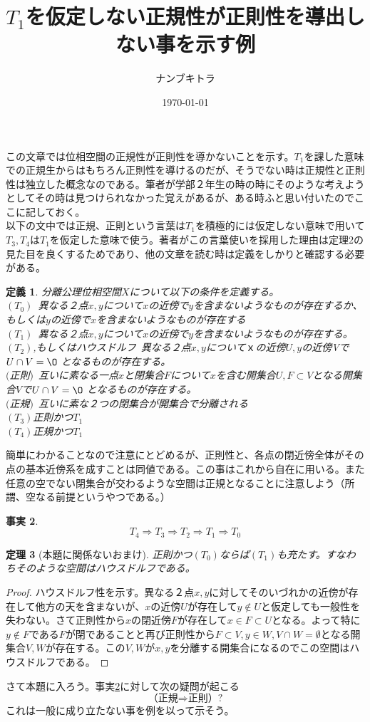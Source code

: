 \documentclass{jsarticle}
\title{$T_1$を仮定しない正規性が正則性を導出しない事を示す例}
\author{ナンブキトラ}
\date{\today}
\newtheorem{thm}{定理}
\newtheorem{df}[thm]{定義}
\newtheorem{fact}[thm]{事実}
\begin{document}
\maketitle
この文章では位相空間の正規性が正則性を導かないことを示す。$T_1$を課した意味での正規生からはもちろん正則性を導けるのだが、そうでない時は正規性と正則性は独立した概念なのである。筆者が学部２年生の時の時にそのような考えようとしてその時は見つけられなかった覚えがあるが、ある時ふと思い付いたのでここに記しておく。\\ 
以下の文中では正規、正則という言葉は$T_1$を積極的には仮定しない意味で用いて$T_3,T_4$は$T_1$を仮定した意味で使う。著者がこの言葉使いを採用した理由は定理2の見た目を良くするためであり、他の文章を読む時は定義をしかりと確認する必要がある。

\begin{df}分離公理位相空間$X$について以下の条件を定義する。\\
$(T_0)$\  異なる２点$x,y$について$x$の近傍で$y$を含まないようなものが存在するか、もしくは$y$の近傍で$x$を含まないようなものが存在する\\ 
$(T_1)$\ 異なる２点$x,y$について$x$の近傍で$y$を含まないようなものが存在する。\\
$(T_2)$,もしくはハウスドルフ\ 異なる２点$x,y$について$ｘ$の近傍$U,y$の近傍Vで$U\cap V=\O $ となるものが存在する。\\
$($正則$)$\ 互いに素なる一点$x$と閉集合$F$について$x$を含む開集合$U,F\subset V$となる開集合$V$で$U\cap V=\O$ となるものが存在する。\\
$($正規$)$\ 互いに素な２つの閉集合が開集合で分離される\\
$(T_3)$正則かつ$T_{1}$\\
$(T_{4})$正規かつ$T_{1}$\\
\end{df}
簡単にわかることなので注意にとどめるが、正則性と、各点の閉近傍全体がその点の基本近傍系を成すことは同値である。この事はこれから自在に用いる。また任意の空でない閉集合が交わるような空間は正規となることに注意しよう（所謂、空なる前提というやつである。）

\begin{fact}\label{fact}
\[
T_{4}\Rightarrow T_{3}\Rightarrow T_{2}\Rightarrow T_{1}\Rightarrow T_0
\]
\end{fact}

\begin{thm}[本題に関係ないおまけ]\label{omake}
正則かつ$(T_0)$ならば$(T_1)$も充たす。すなわちそのような空間はハウスドルフである。
\end{thm}
\begin{proof}ハウスドルフ性を示す。異なる２点$x,y$に対してそのいづれかの近傍が存在して他方の天を含まないが、$x$の近傍$U$が存在して$y\not\in U$と仮定しても一般性を失わない。さて正則性から$x$の閉近傍$F$が存在して$x\in F\subset U$となる。よって特に$y\not\in F$である$F$が閉であることと再び正則性から$F\subset V, y\in W,V\cap W=\emptyset$となる開集合$V,W$が存在する。この$V,W$が$x,y$を分離する開集合になるのでこの空間はハウスドルフである。
\end{proof}
さて本題に入ろう。事実\ref{fact}に対して次の疑問が起こる
\[
\text{（正規$\Rightarrow$正則）?}
\]
これは一般に成り立たない事を例を以って示そう。
\end{document}
